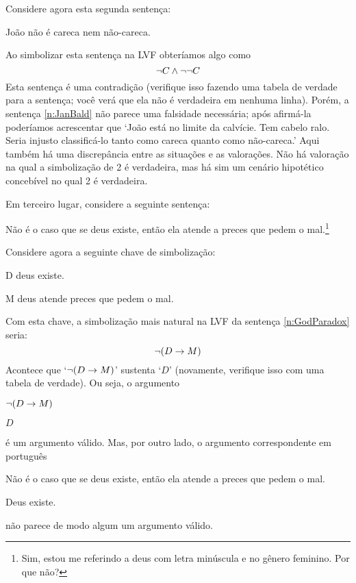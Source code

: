 Considere agora esta segunda sentença:
	\begin{earg} \setcounter{eargnum}{1}
		\item\label{n:JanBald} João não é careca nem não-careca.
	\end{earg}
Ao simbolizar esta sentença na LVF obteríamos algo como
$$\neg C \wedge \neg \neg C$$
Esta sentença é uma contradição (verifique isso fazendo uma tabela de verdade para a sentença; você verá que ela não é verdadeira em nenhuma linha).
Porém, a sentença \ref{n:JanBald} não parece uma falsidade necessária; após afirmá-la poderíamos acrescentar que `João está no limite da calvície.
Tem cabelo ralo. Seria injusto classificá-lo tanto como careca quanto como não-careca.'
Aqui também há uma discrepância entre as situações e as valorações.
Não há valoração na qual a simbolização de 2 é verdadeira, mas há sim um cenário hipotético concebível no qual 2 é verdadeira.

Em terceiro lugar, considere a seguinte sentença:
	\begin{earg}
\setcounter{eargnum}{2}	
		\item\label{n:GodParadox}	Não é o caso que se deus existe, então ela atende a preces que pedem o mal.\footnote{ Sim, estou me referindo a deus com letra minúscula e no gênero feminino. Por que não?}
	\end{earg}
Considere agora a seguinte chave de simbolização:
\begin{ekey}
	\item[D] deus existe.
	\item[M] deus atende preces que pedem o mal.
\end{ekey}
Com esta chave, a simbolização mais natural na LVF da sentença \ref{n:GodParadox} seria:
$$\neg (D \rightarrow M)$$
Acontece que `$\neg (D \rightarrow M)$' sustenta `$D$' (novamente, verifique isso com uma tabela de verdade).
Ou seja, o argumento
	\begin{earg}
		\item[] $\neg (D \rightarrow M)$
		\item[\therefore] $D$
	\end{earg}
é um argumento válido.
Mas, por outro lado, o argumento correspondente em português
	\begin{earg}
		\item[] Não é o caso que se deus existe, então ela atende a preces que pedem o mal.
		\item[\therefore] Deus existe.
	\end{earg}
não parece de modo algum um argumento válido.

